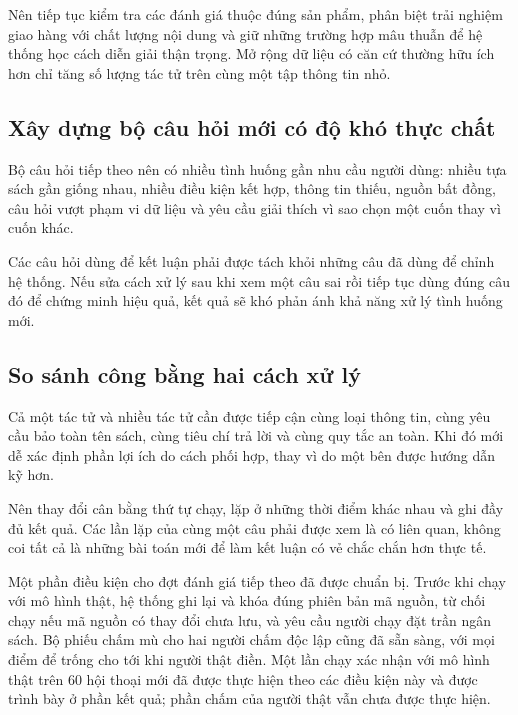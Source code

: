 Nên tiếp tục kiểm tra các đánh giá thuộc đúng sản phẩm, phân biệt trải nghiệm giao hàng với chất lượng nội dung và giữ những trường hợp mâu thuẫn để hệ thống học cách diễn giải thận trọng. Mở rộng dữ liệu có căn cứ thường hữu ích hơn chỉ tăng số lượng tác tử trên cùng một tập thông tin nhỏ.

\subsection{Xây dựng bộ câu hỏi mới có độ khó thực chất}
Bộ câu hỏi tiếp theo nên có nhiều tình huống gần nhu cầu người dùng: nhiều tựa sách gần giống nhau, nhiều điều kiện kết hợp, thông tin thiếu, nguồn bất đồng, câu hỏi vượt phạm vi dữ liệu và yêu cầu giải thích vì sao chọn một cuốn thay vì cuốn khác.

Các câu hỏi dùng để kết luận phải được tách khỏi những câu đã dùng để chỉnh hệ thống. Nếu sửa cách xử lý sau khi xem một câu sai rồi tiếp tục dùng đúng câu đó để chứng minh hiệu quả, kết quả sẽ khó phản ánh khả năng xử lý tình huống mới.

\subsection{So sánh công bằng hai cách xử lý}
Cả một tác tử và nhiều tác tử cần được tiếp cận cùng loại thông tin, cùng yêu cầu bảo toàn tên sách, cùng tiêu chí trả lời và cùng quy tắc an toàn. Khi đó mới dễ xác định phần lợi ích do cách phối hợp, thay vì do một bên được hướng dẫn kỹ hơn.

Nên thay đổi cân bằng thứ tự chạy, lặp ở những thời điểm khác nhau và ghi đầy đủ kết quả. Các lần lặp của cùng một câu phải được xem là có liên quan, không coi tất cả là những bài toán mới để làm kết luận có vẻ chắc chắn hơn thực tế.

Một phần điều kiện cho đợt đánh giá tiếp theo đã được chuẩn bị. Trước khi chạy với mô hình thật, hệ thống ghi lại và khóa đúng phiên bản mã nguồn, từ chối chạy nếu mã nguồn có thay đổi chưa lưu, và yêu cầu người chạy đặt trần ngân sách. Bộ phiếu chấm mù cho hai người chấm độc lập cũng đã sẵn sàng, với mọi điểm để trống cho tới khi người thật điền.  Một lần chạy xác nhận với mô hình thật trên 60 hội thoại mới đã được thực hiện theo các điều kiện này và được trình bày ở phần kết quả; phần chấm của người thật vẫn chưa được thực hiện. 

